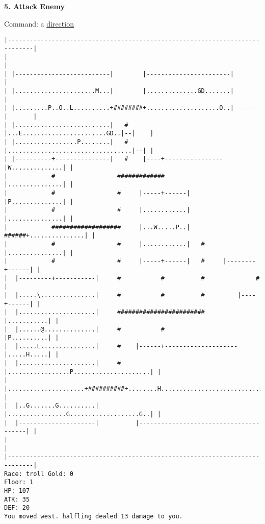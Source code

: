\documentclass[11pt]{article}
\theoremstyle{plain}
\begin{document}
\newpage
\textbf{5. Attack Enemy}

Command: a \underline{direction}

\begin{Verbatim}[fontsize=\scriptsize]
|-----------------------------------------------------------------------------|
|                                                                             |
| |--------------------------|        |-----------------------|               |
| |......................M...|        |..............GD.......|               |
| |.........P..O..L..........+########+....................O..|-------|       |
| |..........................|   #    |...E.......................GD..|--|    |
| |.................P........|   #    |..................................|--| |
| |----------+---------------|   #    |----+----------------|W..............| |
|            #                 #############                |...............| |
|            #                 #     |-----+------|         |P..............| |
|            #                 #     |............|         |...............| |
|            ###################     |...W.....P..|   ######+...............| |
|            #                 #     |............|   #     |...............| |
|            #                 #     |-----+------|   #     |--------+------| |
|  |---------+-----------|     #           #          #              #        |
|  |.....\...............|     #           #          #         |----+------| |
|  |.....................|     ########################         |...........| |
|  |......@..............|     #           #                    |P..........| |
|  |.....L...............|     #    |------+--------------------|.....H.....| |
|  |.....................|     #    |.................P.....................| |
|  |.....................+##########+........H..............................| |
|  |..G.......G..........|          |................G...................G..| |
|  |---------------------|          |---------------------------------------| |
|                                                                             |
|-----------------------------------------------------------------------------|
Race: troll Gold: 0                                                    Floor: 1
HP: 107
ATK: 35
DEF: 20
You moved west. halfling dealed 13 damage to you. 
\end{Verbatim}
\end{document}
